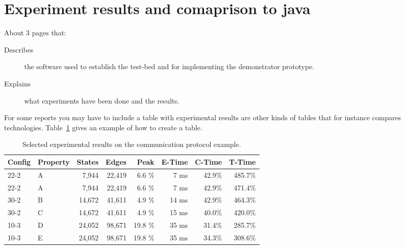 \section{Experiment results and comaprison to java}
\label{sec:experiments}

About 3 pages that:

\begin{description}

\item[Describes] the software used to establish the test-bed and for implementing the demonstrator prototype.

\item[Explains] what experiments have been done and the results.

\end{description}

For some reports you may have to include a table with experimental
results are other kinds of tables that for instance compares
technologies. Table~\ref{tab:results} gives an example of how to create a table.

\begin{table}
\centering
\begin{tabular}{llrrrrrr}
  Config & Property & States & Edges & Peak & E-Time & C-Time & T-Time
  \\ \hline \hline
22-2 & A   &    7,944  &   22,419  &  6.6  \%  &  7 ms & 42.9\% &  485.7\% \\   
22-2 & A   &    7,944  &   22,419  &  6.6  \%  &  7 ms & 42.9\% &  471.4\% \\   
30-2 & B   &   14,672  &   41,611  &  4.9  \%  & 14 ms & 42.9\% &  464.3\% \\   
30-2 & C   &   14,672  &   41,611  &  4.9  \%  & 15 ms & 40.0\% &  420.0\% \\ \hline
10-3 & D   &   24,052  &   98,671  & 19.8  \%  & 35 ms & 31.4\% &  285.7\% \\   
10-3 & E   &   24,052  &   98,671  & 19.8  \%  & 35 ms & 34.3\% &  308.6\% \\
\hline \hline
\end{tabular}
\caption{Selected experimental results on the communication protocol example.}
\label{tab:results}
\end{table}

